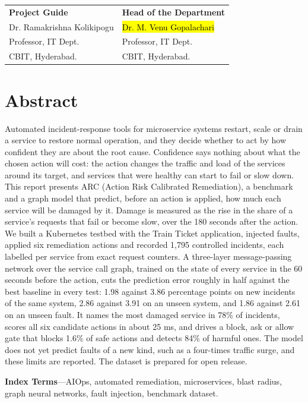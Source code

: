 \documentclass[12pt,a4paper]{report}
\newcommand{\todo}[1]{\hl{#1}}
\begin{document}
\vspace{3.2cm}
\noindent
\begin{tabular}{@{}p{7.2cm}p{7cm}@{}}
\textbf{Project Guide} & \textbf{Head of the Department}\\
Dr. Ramakrishna Kolikipogu & \todo{Dr. M. Venu Gopalachari}\\
Professor, IT Dept. & Professor, IT Dept.\\
CBIT, Hyderabad. & CBIT, Hyderabad.
\end{tabular}
\newpage

\chapter*{Abstract}
Automated incident-response tools for microservice systems restart, scale or drain a service to restore normal operation, and they decide whether to act by how confident they are about the root cause. Confidence says nothing about what the chosen action will cost: the action changes the traffic and load of the services around its target, and services that were healthy can start to fail or slow down. This report presents ARC (Action Risk Calibrated Remediation), a benchmark and a graph model that predict, before an action is applied, how much each service will be damaged by it. Damage is measured as the rise in the share of a service's requests that fail or become slow, over the 180 seconds after the action. We built a Kubernetes testbed with the Train Ticket application, injected faults, applied six remediation actions and recorded 1,795 controlled incidents, each labelled per service from exact request counters. A three-layer message-passing network over the service call graph, trained on the state of every service in the 60 seconds before the action, cuts the prediction error roughly in half against the best baseline in every test: 1.98 against 3.86 percentage points on new incidents of the same system, 2.86 against 3.91 on an unseen system, and 1.86 against 2.61 on an unseen fault. It names the most damaged service in 78\% of incidents, scores all six candidate actions in about 25 ms, and drives a block, ask or allow gate that blocks 1.6\% of safe actions and detects 84\% of harmful ones. The model does not yet predict faults of a new kind, such as a four-times traffic surge, and these limits are reported. The dataset is prepared for open release.

\vspace{6pt}
\noindent\textbf{Index Terms}---AIOps, automated remediation, microservices, blast radius, graph neural networks, fault injection, benchmark dataset.
\newpage
\end{document}
